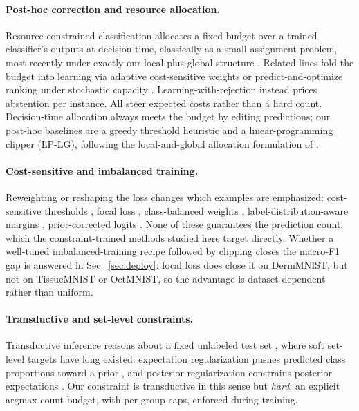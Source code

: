 \documentclass[10pt]{article}
\begin{document}
\paragraph{Post-hoc correction and resource allocation.}
Resource-constrained classification allocates a fixed budget over a trained
classifier's outputs at decision time, classically as a small assignment
problem, most recently under exactly our local-plus-global structure
\citep{shifman2025classification}. Related lines fold the budget into learning via adaptive cost-sensitive
weights \citep{shifman2023adaptive} or predict-and-optimize ranking
under stochastic capacity \citep{vanderschueren2024new}.
Learning-with-rejection \citep{cortes2016learning} instead prices
abstention per instance. All steer expected costs rather than a hard
count. Decision-time allocation always
meets the budget by editing predictions; our post-hoc baselines are a greedy
threshold heuristic and a linear-programming clipper (LP-LG), following
the local-and-global allocation formulation of
\citet{shifman2025classification}.

\paragraph{Cost-sensitive and imbalanced training.}
Reweighting or reshaping the loss changes which examples are emphasized:
cost-sensitive thresholds \citep{elkan2001foundations}, focal loss
\citep{lin2017focal}, class-balanced weights \citep{cui2019class},
label-distribution-aware margins \citep{cao2019learning}, prior-corrected
logits \citep{menon2020long}. None of these guarantees the prediction count, which the
constraint-trained methods studied here target directly. 
{Whether a well-tuned imbalanced-training recipe followed by
clipping closes the macro-F1 gap is answered in Sec.~\ref{sec:deploy}: focal
loss does close it on DermMNIST, but not on TissueMNIST or OctMNIST, so the
advantage is dataset-dependent rather than uniform.}

\paragraph{Transductive and set-level constraints.}
Transductive inference reasons about a fixed unlabeled test set
\citep{vapnik1998statistical,joachims1999transductive}, where soft set-level
targets have long existed: expectation regularization pushes predicted class
proportions toward a prior \citep{mann2007simple}, and posterior
regularization constrains posterior expectations \citep{ganchev2009posterior}.
Our constraint is transductive in this sense but \emph{hard}: an explicit
argmax count budget, with per-group caps, enforced during training.
\end{document}
